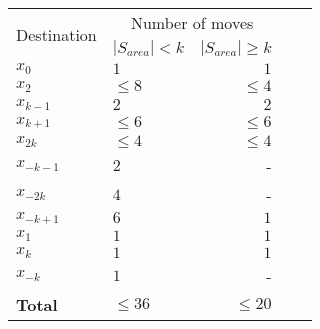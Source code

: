 \begin{comment}
\begin{center}
  \begin{tabular}{|c|c|}
 \hline
 Destination & number of moves \\
 &\\
 \hline
$x_2$ & $\leq 8$ when $\left\vert{S_{area}}\right\vert < k$  \\   
&\\
& $\leq 4$ when $\left\vert{S_{area}}\right\vert \ge k$  \\   
&\\
\hline
 $x_{k-1}$ & $ 2$\\
 &\\
 \hline
 $x_{k+1}$ & $\leq 6$  \\ 
 &\\
 \hline
 $x_{2k}$ & $\leq4$  \\ 
& \\
\hline
$x_{-k-1}$ & $2$  \\ 
 &\\
 \hline
$x_{-2k}$ & $4$  \\  %
 &\\
 \hline
$x_{-k+1}$ & $6$  \\ 
 &\\
 \hline
\end{tabular} 
 \end{center}
\end{comment}


\begin{center}
\begin{tabular}{|l|lr|lr|}\hline
\multirow{2}{1 in}{Destination} &
\multicolumn{2}{c|}{Number of moves}
\\
& $\left\vert{S_{area}}\right\vert < k$ & $\left\vert{S_{area}}\right\vert \ge k$ \\\hline\hline
$x_0$       & $1$ & $1$  \\\hline
$x_2$       & $\leq8$ & $\leq 4$  \\\hline
$x_{k-1}$    & $2$   & $2$     \\\hline
$x_{k+1}$ & $\leq 6$   & $\leq 6$         \\\hline
$x_{2k}$            & $\leq 4$   & $\leq 4$        \\\hline

$x_{-k-1}$    & $2$   & -     \\\hline
$x_{-2k}$ & $4$   & -        \\\hline
$x_{-k+1}$            & $6$   & $1$        \\\hline
$x_1$       & $1$ & $1$  \\\hline
$x_k$       & $1$ & $1$  \\\hline
$x_{-k}$       & $1$ & -  \\\hline
{\bf Total}     & $\leq 36$   & $\leq 20$ \\\hline
\end{tabular}
\end{center}




